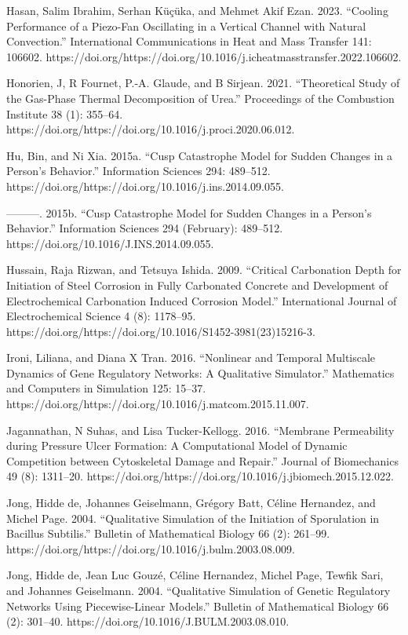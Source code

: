 \documentclass[utf8]{gradu3}
\begin{document}
Hasan, Salim Ibrahim, Serhan Küçüka, and Mehmet Akif Ezan. 2023. “Cooling Performance of a Piezo-Fan Oscillating in a Vertical Channel with Natural Convection.” International Communications in Heat and Mass Transfer 141: 106602. https://doi.org/https://doi.org/10.1016/j.icheatmasstransfer.2022.106602.

Honorien, J, R Fournet, P.-A. Glaude, and B Sirjean. 2021. “Theoretical Study of the Gas-Phase Thermal Decomposition of Urea.” Proceedings of the Combustion Institute 38 (1): 355–64. https://doi.org/https://doi.org/10.1016/j.proci.2020.06.012.

Hu, Bin, and Ni Xia. 2015a. “Cusp Catastrophe Model for Sudden Changes in a Person’s Behavior.” Information Sciences 294: 489–512. https://doi.org/https://doi.org/10.1016/j.ins.2014.09.055.

———. 2015b. “Cusp Catastrophe Model for Sudden Changes in a Person’s Behavior.” Information Sciences 294 (February): 489–512. https://doi.org/10.1016/J.INS.2014.09.055.

Hussain, Raja Rizwan, and Tetsuya Ishida. 2009. “Critical Carbonation Depth for Initiation of Steel Corrosion in Fully Carbonated Concrete and Development of Electrochemical Carbonation Induced Corrosion Model.” International Journal of Electrochemical Science 4 (8): 1178–95. https://doi.org/https://doi.org/10.1016/S1452-3981(23)15216-3.

Ironi, Liliana, and Diana X Tran. 2016. “Nonlinear and Temporal Multiscale Dynamics of Gene Regulatory Networks: A Qualitative Simulator.” Mathematics and Computers in Simulation 125: 15–37. https://doi.org/https://doi.org/10.1016/j.matcom.2015.11.007.

Jagannathan, N Suhas, and Lisa Tucker-Kellogg. 2016. “Membrane Permeability during Pressure Ulcer Formation: A Computational Model of Dynamic Competition between Cytoskeletal Damage and Repair.” Journal of Biomechanics 49 (8): 1311–20. https://doi.org/https://doi.org/10.1016/j.jbiomech.2015.12.022.

Jong, Hidde de, Johannes Geiselmann, Grégory Batt, Céline Hernandez, and Michel Page. 2004. “Qualitative Simulation of the Initiation of Sporulation in Bacillus Subtilis.” Bulletin of Mathematical Biology 66 (2): 261–99. https://doi.org/https://doi.org/10.1016/j.bulm.2003.08.009.

Jong, Hidde de, Jean Luc Gouzé, Céline Hernandez, Michel Page, Tewfik Sari, and Johannes Geiselmann. 2004. “Qualitative Simulation of Genetic Regulatory Networks Using Piecewise-Linear Models.” Bulletin of Mathematical Biology 66 (2): 301–40. https://doi.org/10.1016/J.BULM.2003.08.010.
\end{document}
